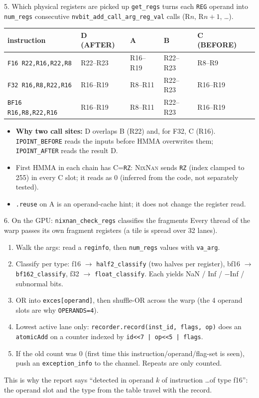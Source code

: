 \documentclass[aspectratio=169,10pt]{beamer}
\newcommand{\nn}{\textsc{NixNan}}
\newcommand{\tx}[1]{\texttt{\small #1}}
\begin{document}
\begin{frame}[fragile]{5. Which physical registers are picked up}
\footnotesize
\tx{get\_regs} turns each \texttt{REG} operand into \texttt{num\_regs} consecutive \tx{nvbit\_add\_call\_arg\_reg\_val} calls (R$n$, R$n{+}1$, \dots).
\medskip
\centering
\begin{tabular}{@{}l l l l l l@{}}
\toprule
instruction & D (AFTER) & A & B & C (BEFORE)\\
\midrule
\tx{F16 R22,R16,R22,R8} & R22--R23 & R16--R19 & R22--R23 & R8--R9\\
\tx{F32 R16,R8,R22,R16} & R16--R19 & R8--R11 & R22--R23 & R16--R19\\
\tx{BF16 R16,R8,R22,R16} & R16--R19 & R8--R11 & R22--R23 & R16--R19\\
\bottomrule
\end{tabular}
\medskip

\raggedright
\begin{itemize}
\item \textbf{Why two call sites:} D overlaps B (R22) and, for F32, C (R16). \tx{IPOINT\_BEFORE} reads the inputs before HMMA overwrites them; \tx{IPOINT\_AFTER} reads the result D.
\item First HMMA in each chain has C=\tx{RZ}: \nn{} sends \tx{RZ} (index clamped to 255) in every C slot; it reads as 0 (inferred from the code, not separately tested).
\item \tx{.reuse} on A is an operand-cache hint; it does not change the register read.
\end{itemize}
\end{frame}

\begin{frame}[fragile]{6. On the GPU: \tx{nixnan\_check\_regs} classifies the fragments}
\footnotesize
Every thread of the warp passes its own fragment registers (a tile is spread over 32 lanes).
\begin{enumerate}
\item Walk the args: read a \tx{reginfo}, then \texttt{num\_regs} values with \tx{va\_arg}.
\item Classify per type: f16 $\to$ \tx{half2\_classify} (two halves per register), bf16 $\to$ \tx{bf162\_classify}, f32 $\to$ \tx{float\_classify}. Each yields NaN / Inf / $-$Inf / subnormal bits.
\item OR into \tx{exces[operand]}, then shuffle-OR across the warp (the 4 operand slots are why \tx{OPERANDS=4}).
\item Lowest active lane only: \tx{recorder.record(inst\_id, flags, op)} does an \tx{atomicAdd} on a counter indexed by \tx{id<<7 | op<<5 | flags}.
\item If the old count was 0 (first time this instruction/operand/flag-set is seen), push an \tx{exception\_info} to the channel. Repeats are only counted.
\end{enumerate}
This is why the report says ``detected in operand $k$ of instruction \dots of type f16'': the operand slot and the type from the table travel with the record.
\end{frame}
\end{document}
